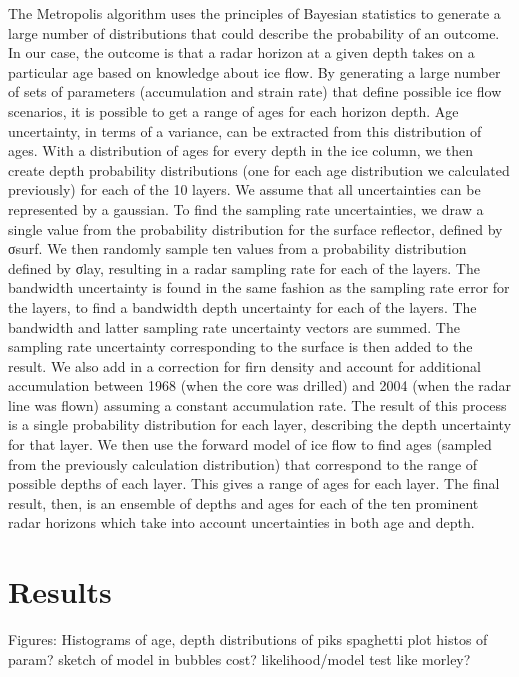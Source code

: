 \documentclass[draft,jgrga]{agutex}
\begin{document}
	The Metropolis algorithm uses the principles of Bayesian statistics to generate a large number of distributions that could describe the probability of an outcome. In our case, the outcome is that a radar horizon at a given depth takes on a particular age based on knowledge about ice flow. By generating a large number of sets of parameters (accumulation and strain rate) that define possible ice flow scenarios, it is possible to get a range of ages for each horizon depth. Age uncertainty, in terms of a variance, can be extracted from this distribution of ages.
	With a distribution of ages for every depth in the ice column, we then create depth probability distributions (one for each age distribution we calculated previously) for each of the 10 layers. We assume that all uncertainties can be represented by a gaussian. To find the sampling rate uncertainties, we draw a single value from the probability distribution for the surface reflector, defined by σsurf. We then randomly sample ten values from a probability distribution defined by σlay, resulting in a radar sampling rate for each of the layers. The bandwidth uncertainty is found in the same fashion as the sampling rate error for the layers, to find a bandwidth depth uncertainty for each of the layers. The bandwidth and latter sampling rate uncertainty vectors are summed.  The sampling rate uncertainty corresponding to the surface is then added to the result. We also add in a correction for firn density and account for additional accumulation between 1968 (when the core was drilled) and 2004 (when the radar line was flown) assuming a constant accumulation rate.
	The result of this process is a single probability distribution for each layer, describing the depth uncertainty for that layer. We then use the forward model of ice flow to find ages (sampled from the previously calculation distribution) that correspond to the range of possible depths of each layer. This gives a range of ages for each layer. The final result, then, is an ensemble of depths and ages for each of the ten prominent radar horizons which take into account uncertainties in both age and depth.






\section{Results}
Figures:
Histograms of age, depth distributions of piks
spaghetti plot
histos of param?
sketch of model in bubbles
cost?
likelihood/model test like morley?
\end{document}
